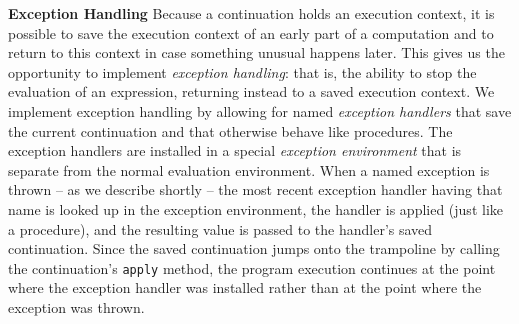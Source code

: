 \begin{minipage}[t]{\sw}
\slidenumber
\LARGE
{\bf Exception Handling}\exx
Because a continuation holds an execution context,
it is possible to save the execution context
of an early part of a computation
and to return to this context in case something unusual happens later.
This gives us the opportunity to implement {\em exception handling}:
that is, the ability to stop the evaluation of an expression,
returning instead to a saved execution context.\exx
We implement exception handling
by allowing for named {\em exception handlers}
that save the current continuation
and that otherwise behave like procedures.
The exception handlers are installed
in a special {\em exception environment}
that is separate from the normal evaluation environment.
When a named exception is thrown -- as we describe shortly --
the most recent exception handler having that name is looked up
in the exception environment,
the handler is applied (just like a procedure),
and the resulting value is passed
to the handler's saved continuation.\exx
Since the saved continuation jumps onto the trampoline
by calling the continuation's \verb'apply' method,
the program execution continues
at the point where the exception handler was installed
rather than at the point where the exception was thrown.
\end{minipage}
